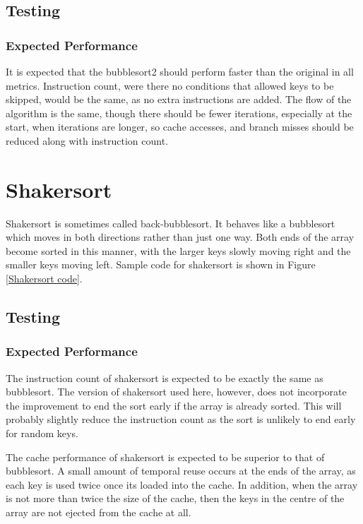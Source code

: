 \subsection{Testing}
\subsubsection{Expected Performance}
It is expected that the bubblesort2 should perform faster than the original in
all metrics. Instruction count, were there no conditions that allowed keys to be
skipped, would be the same, as no extra instructions are added. The flow of the
algorithm is the same, though there should be fewer iterations, especially at
the start, when iterations are longer, so cache accesses, and branch misses
should be reduced along with instruction count.

\section{Shakersort}
Shakersort is sometimes called back-bubblesort. It behaves like a bubblesort
which moves in both directions rather than just one way. Both ends of the array
become sorted in this manner, with the larger keys slowly moving right and the
smaller keys moving left. Sample code for shakersort is shown in Figure
\vref{Shakersort code}.

\subsection{Testing}
\subsubsection{Expected Performance}
The instruction count of shakersort is expected to be exactly the same as
bubblesort. The version of shakersort used here, however, does not incorporate
the improvement to end the sort early if the array is already sorted. This will
probably slightly reduce the instruction count as the sort is unlikely to end
early for random keys. 

The cache performance of shakersort is expected to be superior to that of
bubblesort. A small amount of temporal reuse occurs at the ends of the array,
as each key is used twice once its loaded into the cache. In addition, when the
array is not more than twice the size of the cache, then the keys in the centre
of the array are not ejected from the cache at all.

